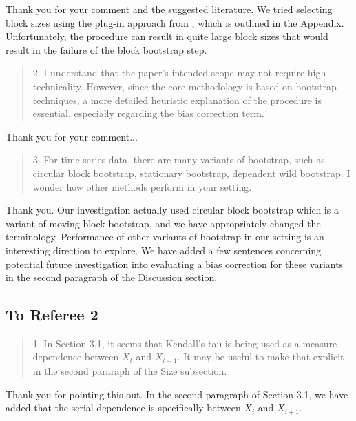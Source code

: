 \documentclass[12pt]{article}
\newenvironment{comment}%
{\begin{quotation}\noindent\small\it\color{darkblue}\ignorespaces%
}{\end{quotation}}
\begin{document}
Thank you for your comment and the suggested literature. We 
tried selecting block sizes using the plug-in approach 
from \citet{politis2004automatic}, which is outlined in the Appendix. 
Unfortunately, the procedure can result
in quite large block sizes that would result in the failure of the block
bootstrap step.



\begin{comment}
2. I understand that the paper’s intended scope may not require high 
technicality. However,
since the core methodology is based on bootstrap techniques, a more detailed 
heuristic
explanation of the procedure is essential, especially regarding the bias 
correction term.
\end{comment}

Thank you for your comment...



\begin{comment}
3. For time series data, there are many variants of bootstrap, such as circular 
block bootstrap,
stationary bootstrap, dependent wild bootstrap. I wonder how other methods 
perform in
your setting.
\end{comment} 

Thank you. Our investigation actually used circular block bootstrap which
is a variant of moving block bootstrap, and we have appropriately changed
the terminology. Performance of other variants of 
bootstrap in our setting is an interesting direction to explore. We have added a 
few
sentences concerning potential future investigation into evaluating a bias 
correction for these variants in the second paragraph of the Discussion 
section.



\subsection*{To Referee 2}

\begin{comment}
1. In Section 3.1, it seems that Kendall's tau is being used as a measure
dependence between $X_t$ and $X_{t+1}$. It may be useful to make that explicit 
in the
second pararaph of the Size subsection.
\end{comment}

Thank you for pointing this out. In the second paragraph of Section 3.1, 
we have added that the
serial dependence is specifically between $X_i$ and $X_{i+1}$.
\end{document}
